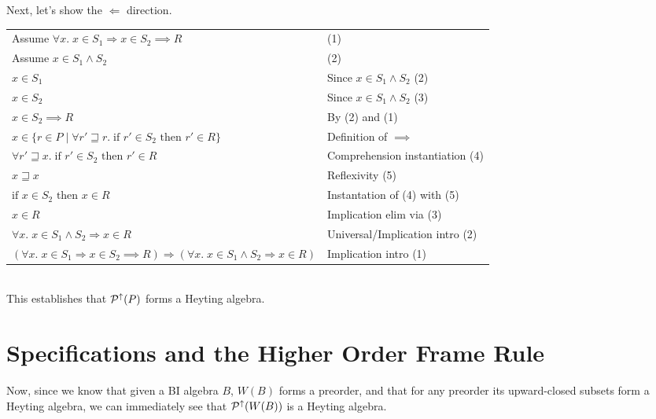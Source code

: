 Next, let's show the $\Leftarrow$ direction. 
\\

\begin{tabular}{ll}
Assume $\forall x.\; x \in S_1 \Rightarrow x \in S_2 \implies R$ &
(1) \\

Assume $x \in S_1 \land S_2$ & 
(2) \\

$x \in S_1$ & 
Since $x \in S_1 \land S_2$ (2)\\

$x \in S_2$ & 
Since $x \in S_1 \land S_2$ (3) \\

$x \in S_2 \implies R$ & 
By (2) and (1) \\

$x \in \{ r \in P \;|\; \forall r' \sqsupseteq r.\; \mbox{if } r' \in S_2 \mbox{ then } r' \in R \}$ &
Definition of $\implies$ \\

$\forall r' \sqsupseteq x.\; \mbox{if } r' \in S_2 \mbox{ then } r' \in R$ &
Comprehension instantiation (4) \\

$x \sqsupseteq x$ & 
Reflexivity (5) \\

$\mbox{if } x \in S_2 \mbox{ then } x \in R$ & 
Instantation of (4) with (5) \\

$x \in R$ & 
Implication elim via (3) \\

$\forall x.\; x \in S_1 \land S_2 \Rightarrow x \in R$ & 
Universal/Implication intro (2) \\

$(\forall x.\; x \in S_1 \Rightarrow x \in S_2 \implies R) \Rightarrow (\forall x.\; x \in S_1 \land S_2 \Rightarrow x \in R)$ & 
Implication intro (1) \\
\end{tabular}
\\

This establishes that $\mathcal{P}^{\uparrow}({P})$ forms a Heyting algebra. 

\section{Specifications and the Higher Order Frame Rule}

Now, since we know that given a BI algebra $B$, $W(B)$ forms a preorder, and
that for any preorder its upward-closed subsets form a Heyting algebra, we
can immediately see that $\mathcal{P}^{\uparrow}({W(B}))$ is a Heyting algebra. 

